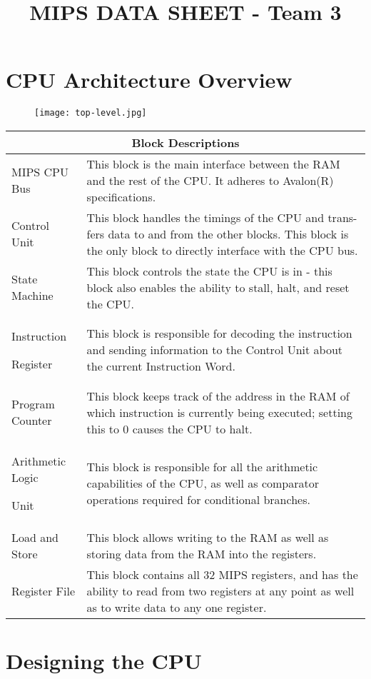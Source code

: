 \documentclass{article}
\title{MIPS DATA SHEET - Team 3\vspace{-2em}}
\date{}
\begin{document}
\maketitle

\section{CPU Architecture Overview}

\begin{figure}[htp]
\centering
\texttt{[image: top-level.jpg]}
\end{figure}

\begin{tabular}[htp]{ |p{3cm}|p{8cm}|}
\hline
\multicolumn{2}{|c|}{Block Descriptions} \\
\hline
MIPS CPU Bus & This block is the main interface between the RAM
and the rest of the CPU. It adheres to Avalon(R)
specifications.  \\
Control Unit & This block handles the timings of the CPU and trans-
fers data to and from the other blocks. This block 
is the only block to directly interface with the CPU 
bus. \\
State Machine & This block controls the state the CPU is 
in - this block also enables the ability to stall, halt, 
and reset the CPU.  \\
Instruction 

Register & This block is responsible for decoding the instruction
and sending information to the Control Unit about 
the current Instruction Word. \\
Program Counter & This block keeps track of the address in the RAM of 
which instruction is currently being executed; setting this to 0 causes the CPU to halt. \\
Arithmetic Logic 

Unit & This block is responsible for all the arithmetic capabilities of the CPU, as well as comparator operations required for conditional branches.  \\
Load and Store & This block allows writing to the RAM as well as storing data from the RAM into the registers.  \\
Register File & This block contains all 32 MIPS registers, and has the ability to read from two registers at any point as well as to write data to any one register.\\
\hline
\end{tabular}


\section{Designing the CPU}
\end{document}
